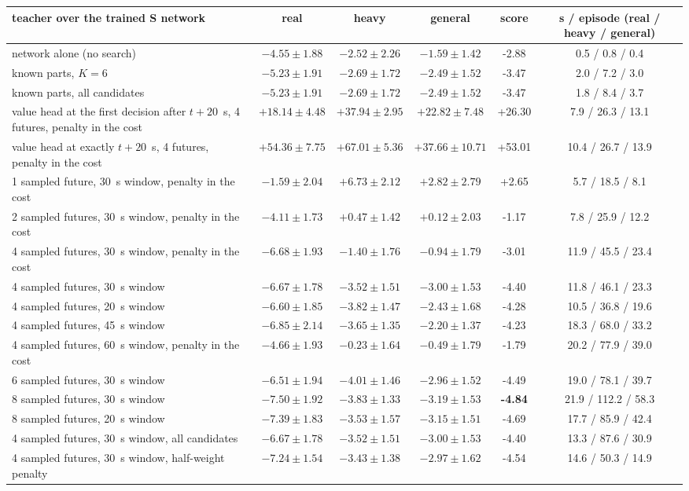 \begin{tabular}{@{}lccccc@{}}
\toprule
teacher over the trained S network & real & heavy & general & score & s / episode (real / heavy / general) \\
\midrule
network alone (no search) & $-4.55 \pm 1.88$ & $-2.52 \pm 2.26$ & $-1.59 \pm 1.42$ & -2.88 & 0.5 / 0.8 / 0.4 \\
known parts, $K=6$ & $-5.23 \pm 1.91$ & $-2.69 \pm 1.72$ & $-2.49 \pm 1.52$ & -3.47 & 2.0 / 7.2 / 3.0 \\
known parts, all candidates & $-5.23 \pm 1.91$ & $-2.69 \pm 1.72$ & $-2.49 \pm 1.52$ & -3.47 & 1.8 / 8.4 / 3.7 \\
value head at the first decision after $t+20$~s, 4 futures, penalty in the cost & $+18.14 \pm 4.48$ & $+37.94 \pm 2.95$ & $+22.82 \pm 7.48$ & +26.30 & 7.9 / 26.3 / 13.1 \\
value head at exactly $t+20$~s, 4 futures, penalty in the cost & $+54.36 \pm 7.75$ & $+67.01 \pm 5.36$ & $+37.66 \pm 10.71$ & +53.01 & 10.4 / 26.7 / 13.9 \\
1 sampled future, 30~s window, penalty in the cost & $-1.59 \pm 2.04$ & $+6.73 \pm 2.12$ & $+2.82 \pm 2.79$ & +2.65 & 5.7 / 18.5 / 8.1 \\
2 sampled futures, 30~s window, penalty in the cost & $-4.11 \pm 1.73$ & $+0.47 \pm 1.42$ & $+0.12 \pm 2.03$ & -1.17 & 7.8 / 25.9 / 12.2 \\
4 sampled futures, 30~s window, penalty in the cost & $-6.68 \pm 1.93$ & $-1.40 \pm 1.76$ & $-0.94 \pm 1.79$ & -3.01 & 11.9 / 45.5 / 23.4 \\
4 sampled futures, 30~s window & $-6.67 \pm 1.78$ & $-3.52 \pm 1.51$ & $-3.00 \pm 1.53$ & -4.40 & 11.8 / 46.1 / 23.3 \\
4 sampled futures, 20~s window & $-6.60 \pm 1.85$ & $-3.82 \pm 1.47$ & $-2.43 \pm 1.68$ & -4.28 & 10.5 / 36.8 / 19.6 \\
4 sampled futures, 45~s window & $-6.85 \pm 2.14$ & $-3.65 \pm 1.35$ & $-2.20 \pm 1.37$ & -4.23 & 18.3 / 68.0 / 33.2 \\
4 sampled futures, 60~s window, penalty in the cost & $-4.66 \pm 1.93$ & $-0.23 \pm 1.64$ & $-0.49 \pm 1.79$ & -1.79 & 20.2 / 77.9 / 39.0 \\
6 sampled futures, 30~s window & $-6.51 \pm 1.94$ & $-4.01 \pm 1.46$ & $-2.96 \pm 1.52$ & -4.49 & 19.0 / 78.1 / 39.7 \\
8 sampled futures, 30~s window & $-7.50 \pm 1.92$ & $-3.83 \pm 1.33$ & $-3.19 \pm 1.53$ & \textbf{-4.84} & 21.9 / 112.2 / 58.3 \\
8 sampled futures, 20~s window & $-7.39 \pm 1.83$ & $-3.53 \pm 1.57$ & $-3.15 \pm 1.51$ & -4.69 & 17.7 / 85.9 / 42.4 \\
4 sampled futures, 30~s window, all candidates & $-6.67 \pm 1.78$ & $-3.52 \pm 1.51$ & $-3.00 \pm 1.53$ & -4.40 & 13.3 / 87.6 / 30.9 \\
4 sampled futures, 30~s window, half-weight penalty & $-7.24 \pm 1.54$ & $-3.43 \pm 1.38$ & $-2.97 \pm 1.62$ & -4.54 & 14.6 / 50.3 / 14.9 \\
\bottomrule
\end{tabular}

